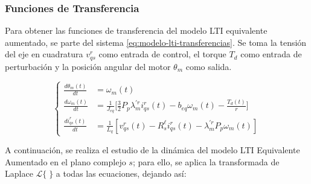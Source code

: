 \documentclass[blue,fullpaper]{ludusofficial}  %
\begin{document}
\subsubsection{Funciones de Transferencia}

Para obtener las funciones de transferencia del modelo LTI
equivalente aumentado, se parte del sistema \eqref{eq:modelo-lti-transferencias}.
Se toma la tensión del eje en cuadratura $v_{qs}^{r}$ como entrada de
control, el torque $T_d$ como entrada de perturbación y la posición
angular del motor $\theta_m$ como salida. 

\begin{equation}
\label{eq:modelo-lti-transferencias}
\left\{
\begin{aligned}
\frac{d\theta_m(t)}{dt} &= \omega_m(t) \\[1.5ex]
\frac{d\omega_{m}(t)}{dt} &= \frac{1}{J_{eq}} \Bigg[ \frac{3}{2}P_{p} \lambda_{m}^{'r} i_{qs}^{r}(t) - b_{eq} \omega_{m}(t) - \frac{T_d(t)}{r} \Bigg]  \\[1.5ex]
\frac{di_{qs}^{r}(t)}{dt}  &= \frac{1}{L_{q} } \left[ v_{qs}^{r}(t) - R_{s}^{\ell} i_{qs}^{r}(t) - \lambda_{m}^{'r}P_{p} \omega_{m}(t) \right]
\end{aligned}
\right.
\end{equation}

A continuación, se realiza el estudio de la dinámica del modelo LTI Equivalente Aumentado en el plano complejo $s$; para ello, se aplica la transformada de Laplace $\mathcal{L}\{\;\}$ a todas las ecuaciones, dejando así:
\end{document}
